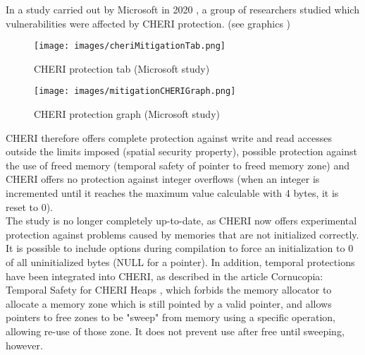 \documentclass[a4paper, 11pt]{article}
\begin{document}
In a study carried out by Microsoft in 2020 \cite{joly2020security}, a group of researchers studied which vulnerabilities were affected by CHERI protection. (see graphics  )
\begin{figure}[h!]
	\centering
	
	\texttt{[image: images/cheriMitigationTab.png]}
	\caption{CHERI protection tab (Microsoft study)\cite{joly2020security}}
	\label{sec:tab}
\end{figure}
\begin{figure}[h!]
	\centering
	
	\texttt{[image: images/mitigationCHERIGraph.png]}
	\caption{CHERI protection graph (Microsoft study)\cite{joly2020security}}
	\label{sec:graph}
\end{figure}
CHERI therefore offers complete protection against write and read accesses outside the limits imposed (spatial security property), possible protection against the use of freed memory (temporal safety of pointer to freed memory zone) and CHERI offers no protection against integer overflows (when an integer is incremented until it reaches the maximum value calculable with 4 bytes, it is reset to 0). 
\\
The study is no longer completely up-to-date, as CHERI now offers experimental protection against problems caused by memories that are not initialized correctly. It is possible to include options during compilation to force an initialization to 0 of all uninitialized bytes (NULL for a pointer).
In addition, temporal protections have been integrated into CHERI, as described in the article Cornucopia: Temporal Safety for CHERI Heaps \cite{filardo2020cornucopia}, which forbids the memory allocator to allocate a memory zone which is still pointed by a valid pointer, and allows pointers to free zones to be "sweep" from memory using a specific operation, allowing re-use of those zone. It does not prevent use after free until sweeping, however.
\\
\end{document}
